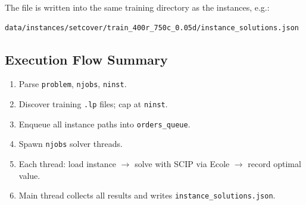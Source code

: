The file is written into the same training directory as the instances, e.g.:

\begin{lstlisting}
data/instances/setcover/train_400r_750c_0.05d/instance_solutions.json
\end{lstlisting}

\subsection{Execution Flow Summary}

\begin{enumerate}
    \item Parse \texttt{problem}, \texttt{njobs}, \texttt{ninst}.
    \item Discover training \texttt{.lp} files; cap at \texttt{ninst}.
    \item Enqueue all instance paths into \texttt{orders\_queue}.
    \item Spawn \texttt{njobs} solver threads.
    \item Each thread: load instance $\to$ solve with SCIP via Ecole $\to$ record optimal value.
    \item Main thread collects all results and writes \texttt{instance\_solutions.json}.
\end{enumerate}
